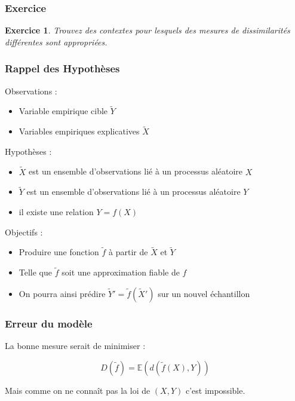 \documentclass[11pt]{beamer}
\newenvironment{slide}[1]{%
\begin{frame}[environment=slide]
\frametitle{#1}
}{%
\end{frame}
}
\newtheorem{exercice}{Exercice}
\begin{document}
\begin{slide}{Exercice}

\begin{exercice}
Trouvez des contextes pour lesquels des mesures de dissimilarités différentes sont appropriées.
\end{exercice}

\end{slide}


\begin{slide}{Rappel des Hypothèses}
Observations :\\

\begin{itemize}

\item Variable empirique cible $\tilde{Y}$
\item Variables empiriques explicatives $\tilde{X}$

\end{itemize}

\pause

Hypothèses :\\

\begin{itemize}

\item $\tilde{X}$ est un ensemble d'observations lié à un processus aléatoire $X$
\item $\tilde{Y}$ est un ensemble d'observations lié à un processus aléatoire $Y$
\item il existe une relation $Y = f(X)$

\end{itemize}

\pause

Objectifs :\\

\begin{itemize}
\item Produire une fonction $\tilde{f}$ à partir de $\tilde{X}$ et $\tilde{Y}$
\item Telle que $\tilde{f}$ soit une approximation fiable de $f$
\item On pourra ainsi prédire $\tilde{Y}' = \tilde{f}(\tilde{X}')$ sur un nouvel échantillon 
\end{itemize}

\end{slide}


\begin{slide}{Erreur du modèle}

La bonne mesure serait de minimiser :

$$D(\tilde{f}) = \mathbb{E}(d(\tilde{f}(X),Y))$$

\pause

Mais comme on ne connaît pas la loi de $(X,Y)$ c'est impossible.

\end{slide}
\end{document}
